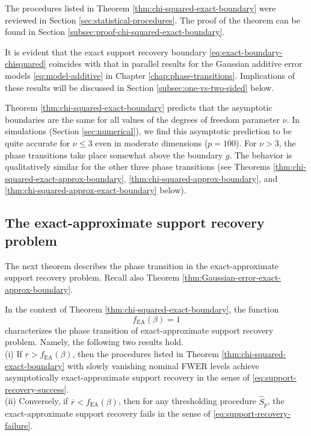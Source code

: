 The procedures listed in Theorem \ref{thm:chi-squared-exact-boundary} were reviewed in Section \ref{sec:statistical-procedures}. 
The proof of the theorem can be found in Section \ref{subsec:proof-chi-squared-exact-boundary}. 

It is evident that the exact support recovery boundary \eqref{eq:exact-boundary-chisquared} coincides with that in parallel results for the Gaussian additive error models \eqref{eq:model-additive} in Chapter \ref{chap:phase-transitions}.
Implications of these results will be discussed in Section \ref{subsec:one-vs-two-sided} below.

\begin{remark} \label{rmk:strong-classification-boundary-2}
Theorem \ref{thm:chi-squared-exact-boundary} predicts that the asymptotic boundaries are the same for all values of the degrees of freedom 
parameter $\nu$.  In simulations (Section \ref{sec:numerical}), we find this asymptotic prediction to be quite accurate for $\nu\le3$ even in 
moderate dimensions ($p=100$).  For $\nu>3$, the phase transitions take place somewhat above the boundary ${g}$.
The behavior is qualitatively similar for the other three phase transitions (see Theorems \ref{thm:chi-squared-exact-approx-boundary}, 
\ref{thm:chi-squared-approx-boundary}, and \ref{thm:chi-squared-approx-exact-boundary} below).
\end{remark}

\subsection{The exact-approximate support recovery problem}
\label{subsec:exact-approx-support-recovery-chisq}

The next theorem describes the phase transition in the exact-approximate support recovery problem. Recall also
Theorem \ref{thm:Gaussian-error-exact-approx-boundary}.

\begin{theorem} \label{thm:chi-squared-exact-approx-boundary}
In the context of Theorem \ref{thm:chi-squared-exact-boundary}, 
the function 
\begin{equation} \label{eq:exact-approx-boundary-chisquared}
    f_{\mathrm{EA}}(\beta) = 1
\end{equation}
characterizes the phase transition of exact-approximate support recovery problem.
 Namely, the following two results hold.\\

{\rm (i)} If $\underline{r} > f_{\mathrm{EA}}(\beta)$, then the procedures listed in Theorem \ref{thm:chi-squared-exact-boundary} with slowly 
vanishing nominal FWER levels achieve asymptotically exact-approximate support recovery in the sense of \eqref{eq:support-recovery-success}. \\

{\rm (ii)} Conversely, if $\overline{r} < f_{\mathrm{EA}}(\beta)$, then for any thresholding procedure $\widehat{S}_p$, the exact-approximate support recovery fails in the sense of \eqref{eq:support-recovery-failure}.
\end{theorem}

